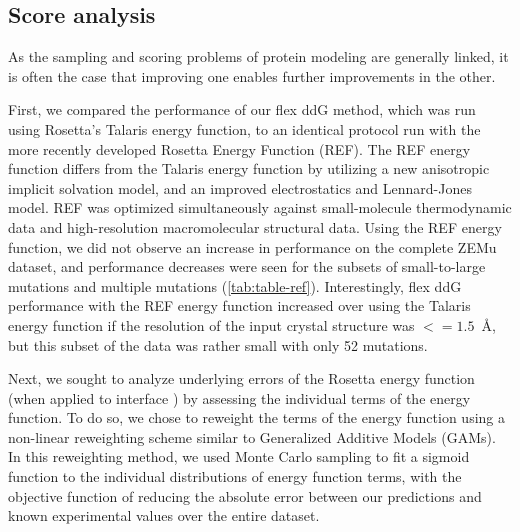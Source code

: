 \subsection{Score analysis}

As the sampling and scoring problems of protein modeling are generally linked, it is often the case that improving one enables further improvements in the other.

First, we compared the performance of our flex ddG method, which was run using Rosetta's Talaris\cite{song_structure-guided_2011,shapovalov_smoothed_2011,omeara_combined_2015} energy function, to an identical protocol run with the more recently developed Rosetta Energy Function (REF)\cite{alford_rosetta_2017}.
The REF energy function differs from the Talaris energy function by utilizing a new anisotropic implicit solvation model, and an improved electrostatics and Lennard-Jones model. REF was optimized simultaneously against small-molecule thermodynamic data and high-resolution macromolecular structural data.
Using the REF energy function, we did not observe an increase in performance on the complete ZEMu dataset, and performance decreases were seen for the subsets of small-to-large mutations and multiple mutations (\cref{tab:table-ref}).
Interestingly, flex ddG performance with the REF energy function increased over using the Talaris energy function if the resolution of the input crystal structure was $<= 1.5$\ \AA, but this subset of the data was rather small with only 52 mutations.

Next, we sought to analyze underlying errors of the Rosetta energy function (when applied to interface \ddg) by assessing the individual terms of the energy function. To do so, we chose to reweight the terms of the energy function using a non-linear reweighting scheme similar to Generalized Additive Models (GAMs)\cite{hastie_generalized_1990}.
In this reweighting method, we used Monte Carlo sampling to fit a sigmoid function to the individual distributions of energy function terms, with the objective function of reducing the absolute error between our predictions and known experimental values over the entire dataset.

